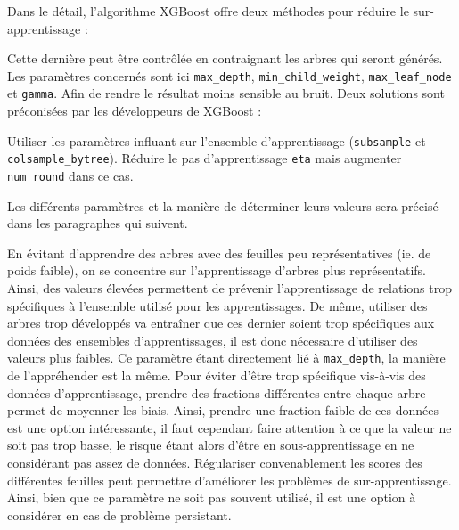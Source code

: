 Dans le détail, l'algorithme XGBoost offre deux méthodes pour réduire le sur-apprentissage :
\begin{itemize}
Cette dernière peut être contrôlée en contraignant les arbres qui seront générés. Les paramètres concernés sont ici \texttt{max\_depth}, \texttt{min\_child\_weight}, \texttt{max\_leaf\_node} et \texttt{gamma}.
Afin de rendre le résultat moins sensible au bruit. Deux solutions sont préconisées par les développeurs de XGBoost :
\begin{itemize}
\subitemperso{}Utiliser les paramètres influant sur l'ensemble d'apprentissage (\texttt{subsample} et \texttt{colsample\_bytree}).
\subitemperso{}Réduire le pas d'apprentissage \texttt{eta} mais augmenter \texttt{num\_round} dans ce cas.
\end{itemize}
\end{itemize}
Les différents paramètres et la manière de déterminer leurs valeurs sera précisé dans les paragraphes qui suivent.

En évitant d'apprendre des arbres avec des feuilles peu représentatives (ie. de poids faible), on se concentre sur l'apprentissage d'arbres plus représentatifs. Ainsi, des valeurs élevées permettent de prévenir l'apprentissage de relations trop spécifiques à l'ensemble utilisé pour les apprentissages.
De même, utiliser des arbres trop développés va entraîner que ces dernier soient trop spécifiques aux données des ensembles d'apprentissages, il est donc nécessaire d'utiliser des valeurs plus faibles.
Ce paramètre étant directement lié à \texttt{max\_depth}, la manière de l'appréhender est la même.
Pour éviter d'être trop spécifique vis-à-vis des données d'apprentissage, prendre des fractions différentes entre chaque arbre permet de moyenner les biais. Ainsi, prendre une fraction \og faible\fg{} de ces données est une option intéressante, il faut cependant faire attention à ce que la valeur ne soit pas trop basse, le risque étant alors d'être en sous-apprentissage en ne considérant pas assez de données.
Régulariser convenablement les scores des différentes feuilles peut permettre d'améliorer les problèmes de sur-apprentissage. Ainsi, bien que ce paramètre ne soit pas souvent utilisé, il est une option à considérer en cas de problème persistant.
